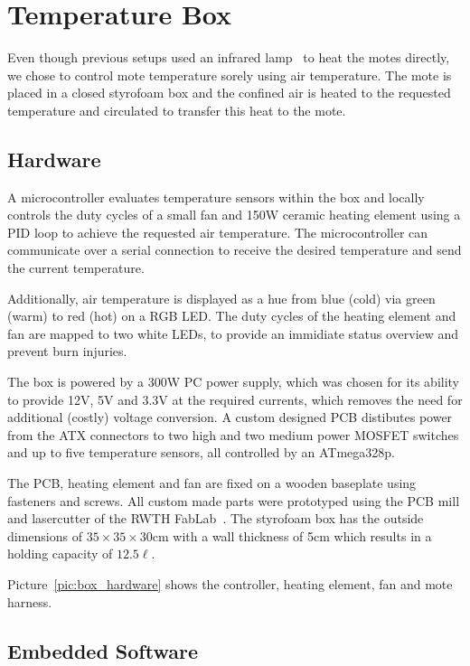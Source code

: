 \section{Temperature Box}

Even though previous setups used an infrared lamp~\cite{Boano2013, Hermans2013} to heat the motes directly, we chose to control mote temperature sorely using air temperature.
The mote is placed in a closed styrofoam box and the confined air is heated to the requested temperature and circulated to transfer this heat to the mote.

\subsection{Hardware}
A microcontroller evaluates temperature sensors within the box and locally controls the duty cycles of a small fan and 150W ceramic heating element using a PID loop to achieve the requested air temperature.
The microcontroller can communicate over a serial connection to receive the desired temperature and send the current temperature.

Additionally, air temperature is displayed as a hue from blue (cold) via green (warm) to red (hot) on a RGB LED.
The duty cycles of the heating element and fan are mapped to two white LEDs, to provide an immidiate status overview and prevent burn injuries.

The box is powered by a 300W PC power supply, which was chosen for its ability to provide 12V, 5V and 3.3V at the required currents, which removes the need for additional (costly) voltage conversion.
A custom designed PCB distibutes power from the ATX connectors to two high and two medium power MOSFET switches and up to five temperature sensors, all controlled by an ATmega328p.

The PCB, heating element and fan are fixed on a wooden baseplate using fasteners and screws.
All custom made parts were prototyped using the PCB mill and lasercutter of the RWTH FabLab~\cite{fablab}.
The styrofoam box has the outside dimensions of $35 \times 35 \times 30$cm with a wall thickness of 5cm which results in a holding capacity of $12.5\ell$.

Picture~\ref{pic:box_hardware} shows the controller, heating element, fan and mote harness.

\subsection{Embedded Software}

